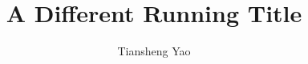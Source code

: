 \documentclass{article}
\begin{document}
 \selectfont

\def\mytitle{A Different Running Title}
\title{\mytitle}
\author{Tiansheng Yao}
\maketitle





\end{document}
